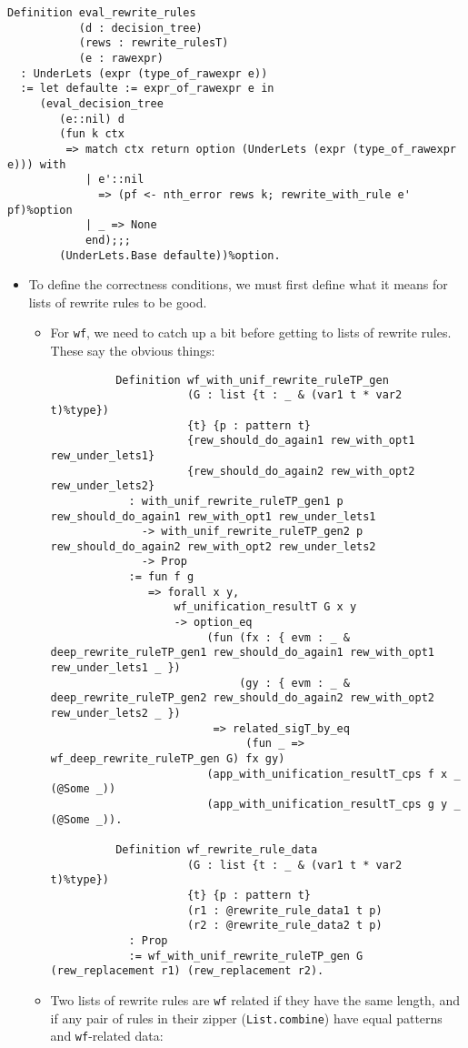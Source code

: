 \begin{itemize}
\begin{verbatim}
Definition eval_rewrite_rules
           (d : decision_tree)
           (rews : rewrite_rulesT)
           (e : rawexpr)
  : UnderLets (expr (type_of_rawexpr e))
  := let defaulte := expr_of_rawexpr e in
     (eval_decision_tree
        (e::nil) d
        (fun k ctx
         => match ctx return option (UnderLets (expr (type_of_rawexpr e))) with
            | e'::nil
              => (pf <- nth_error rews k; rewrite_with_rule e' pf)%option
            | _ => None
            end);;;
        (UnderLets.Base defaulte))%option.
\end{verbatim}

  \begin{itemize}
  \tightlist
  \item
    To define the correctness conditions, we must first define what it
    means for lists of rewrite rules to be good.

    \begin{itemize}
    \item
      For \texttt{wf}, we need to catch up a bit before getting to lists
      of rewrite rules. These say the obvious things:

\begin{verbatim}
          Definition wf_with_unif_rewrite_ruleTP_gen
                     (G : list {t : _ & (var1 t * var2 t)%type})
                     {t} {p : pattern t}
                     {rew_should_do_again1 rew_with_opt1 rew_under_lets1}
                     {rew_should_do_again2 rew_with_opt2 rew_under_lets2}
            : with_unif_rewrite_ruleTP_gen1 p rew_should_do_again1 rew_with_opt1 rew_under_lets1
              -> with_unif_rewrite_ruleTP_gen2 p rew_should_do_again2 rew_with_opt2 rew_under_lets2
              -> Prop
            := fun f g
               => forall x y,
                   wf_unification_resultT G x y
                   -> option_eq
                        (fun (fx : { evm : _ & deep_rewrite_ruleTP_gen1 rew_should_do_again1 rew_with_opt1 rew_under_lets1 _ })
                             (gy : { evm : _ & deep_rewrite_ruleTP_gen2 rew_should_do_again2 rew_with_opt2 rew_under_lets2 _ })
                         => related_sigT_by_eq
                              (fun _ => wf_deep_rewrite_ruleTP_gen G) fx gy)
                        (app_with_unification_resultT_cps f x _ (@Some _))
                        (app_with_unification_resultT_cps g y _ (@Some _)).

          Definition wf_rewrite_rule_data
                     (G : list {t : _ & (var1 t * var2 t)%type})
                     {t} {p : pattern t}
                     (r1 : @rewrite_rule_data1 t p)
                     (r2 : @rewrite_rule_data2 t p)
            : Prop
            := wf_with_unif_rewrite_ruleTP_gen G (rew_replacement r1) (rew_replacement r2).
\end{verbatim}
    \item
      Two lists of rewrite rules are \texttt{wf} related if they have
      the same length, and if any pair of rules in their zipper
      (\texttt{List.combine}) have equal patterns and
      \texttt{wf}-related data:


\end{itemize}
\end{itemize}
\end{itemize}
